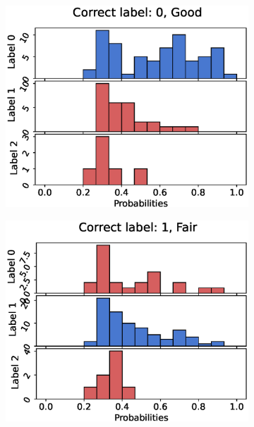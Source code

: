 \begin{figure}
  \centering
  \begin{subfigure}[t]{0.33\textwidth}
    \includegraphics[width=\textwidth]{files/figs/res/pelvis/pc0-rb.eps}
    \caption{}
    \label{fig:pelvis-pc0}
  \end{subfigure}%
  \begin{subfigure}[t]{0.33\textwidth}
    \includegraphics[width=\textwidth]{files/figs/res/pelvis/pc1-rb.eps}
    \caption{}
    \label{fig:pelvis-pc1}
  \end{subfigure}%

\end{figure}

